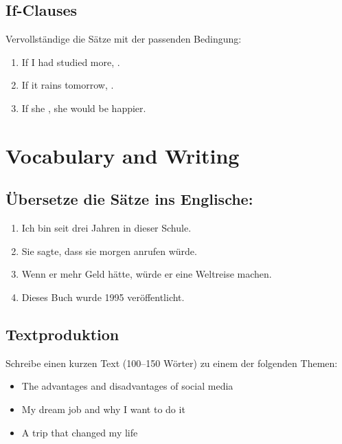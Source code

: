 \subsection{If-Clauses}
Vervollständige die Sätze mit der passenden Bedingung:
\begin{enumerate}
    \item If I had studied more, \underline{\hspace{3cm}}.
    \item If it rains tomorrow, \underline{\hspace{3cm}}.
    \item If she \underline{\hspace{3cm}}, she would be happier.
\end{enumerate}

\section{Vocabulary and Writing}

\subsection{Übersetze die Sätze ins Englische:}
\begin{enumerate}
    \item Ich bin seit drei Jahren in dieser Schule.
    \item Sie sagte, dass sie morgen anrufen würde.
    \item Wenn er mehr Geld hätte, würde er eine Weltreise machen.
    \item Dieses Buch wurde 1995 veröffentlicht.
\end{enumerate}

\subsection{Textproduktion}
Schreibe einen kurzen Text (100–150 Wörter) zu einem der folgenden Themen:
\begin{itemize}
    \item The advantages and disadvantages of social media
    \item My dream job and why I want to do it
    \item A trip that changed my life
\end{itemize}